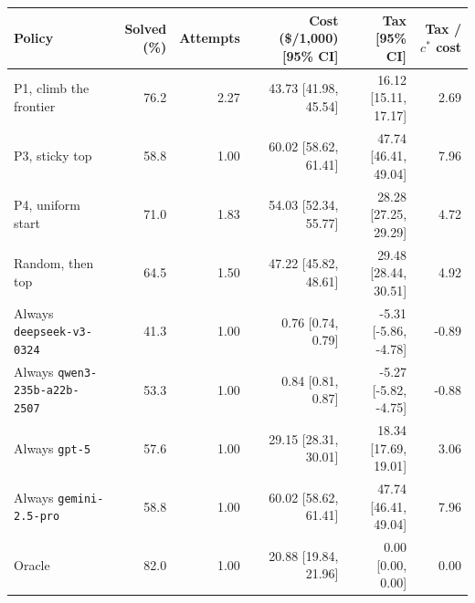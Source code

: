 \setlength{\tabcolsep}{4pt}
\begin{tabular}{@{}lrrrrr@{}}
\toprule
Policy & Solved (\%) & Attempts & Cost (\$/1{,}000) [95\% CI] & Tax [95\% CI] & Tax / $c^*$ cost \\
\midrule
P1, climb the frontier & 76.2 & 2.27 & 43.73 [41.98, 45.54] & 16.12 [15.11, 17.17] & 2.69 \\
P3, sticky top & 58.8 & 1.00 & 60.02 [58.62, 61.41] & 47.74 [46.41, 49.04] & 7.96 \\
P4, uniform start & 71.0 & 1.83 & 54.03 [52.34, 55.77] & 28.28 [27.25, 29.29] & 4.72 \\
Random, then top & 64.5 & 1.50 & 47.22 [45.82, 48.61] & 29.48 [28.44, 30.51] & 4.92 \\
\midrule
Always \texttt{deepseek-v3-0324} & 41.3 & 1.00 & 0.76 [0.74, 0.79] & -5.31 [-5.86, -4.78] & -0.89 \\
Always \texttt{qwen3-235b-a22b-2507} & 53.3 & 1.00 & 0.84 [0.81, 0.87] & -5.27 [-5.82, -4.75] & -0.88 \\
Always \texttt{gpt-5} & 57.6 & 1.00 & 29.15 [28.31, 30.01] & 18.34 [17.69, 19.01] & 3.06 \\
Always \texttt{gemini-2.5-pro} & 58.8 & 1.00 & 60.02 [58.62, 61.41] & 47.74 [46.41, 49.04] & 7.96 \\
\midrule
Oracle & 82.0 & 1.00 & 20.88 [19.84, 21.96] & 0.00 [0.00, 0.00] & 0.00 \\
\bottomrule
\end{tabular}

